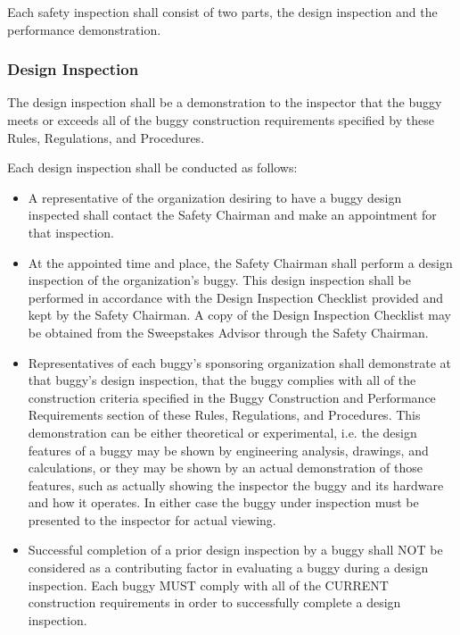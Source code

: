 	Each safety inspection shall consist of two parts, the design inspection and the performance demonstration.

\subsubsection{Design Inspection}

	The design inspection shall be a demonstration to the inspector that the buggy meets or exceeds all of the buggy construction requirements specified by these Rules, Regulations, and Procedures.

	Each design inspection shall be conducted as follows:

	\begin{itemize}

		\item
		A representative of the organization desiring to have a buggy design inspected shall contact the Safety Chairman and make an appointment for that inspection.

		\item
		At the appointed time and place, the Safety Chairman shall perform a design inspection of the organization's buggy. This design inspection shall be performed in accordance with the Design Inspection Checklist provided and kept by the Safety Chairman. A copy of the Design Inspection Checklist may be obtained from the Sweepstakes Advisor through the Safety Chairman.

		\item
		Representatives of each buggy's sponsoring organization shall demonstrate at that buggy's design inspection, that the buggy complies with all of the construction criteria specified in the Buggy Construction and Performance Requirements section of these Rules, Regulations, and Procedures. This demonstration can be either theoretical or experimental, i.e. the design features of a buggy may be shown by engineering analysis, drawings, and calculations, or they may be shown by an actual demonstration of those features, such as actually showing the inspector the buggy and its hardware and how it operates. In either case the buggy under inspection must be presented to the inspector for actual viewing.

		\item
		Successful completion of a prior design inspection by a buggy shall NOT be considered as a contributing factor in evaluating a buggy during a design inspection. Each buggy MUST comply with all of the CURRENT construction requirements in order to successfully complete a design inspection.


\end{itemize}
